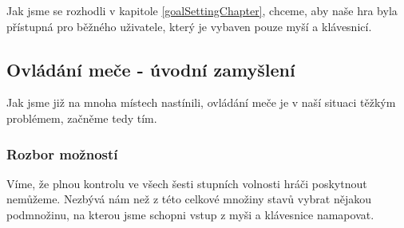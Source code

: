 Jak jsme se rozhodli v kapitole \ref{goalSettingChapter}, chceme, aby naše hra byla přístupná pro běžného uživatele, který je vybaven pouze myší a klávesnicí.

\subsection{Ovládání meče - úvodní zamyšlení}

Jak jsme již na mnoha místech nastínili, ovládání meče je v naší situaci těžkým problémem, začněme tedy tím. 

\subsubsection*{Rozbor možností}

Víme, že plnou kontrolu ve všech šesti stupních volnosti hráči poskytnout nemůžeme. Nezbývá nám než z této celkové množiny stavů vybrat nějakou podmnožinu, na kterou jsme schopni vstup z myši a klávesnice namapovat.

